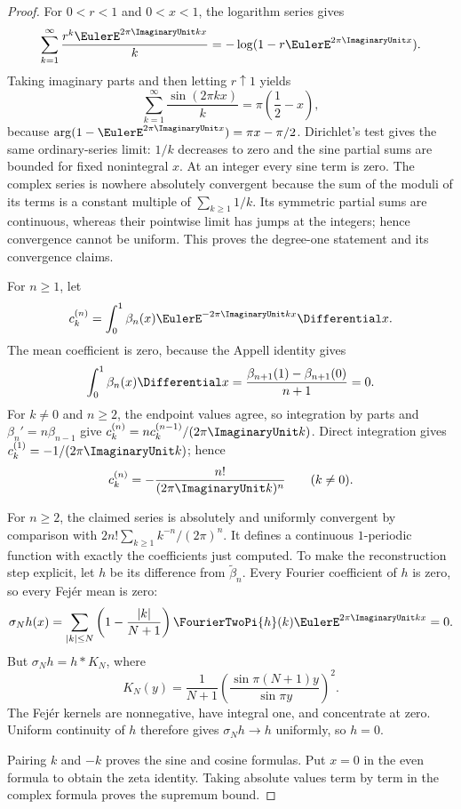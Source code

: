 \documentclass[11pt,a4paper,oneside,openany]{book}
\theoremstyle{definition}
\theoremstyle{remark}
\begin{document}
\begin{proof}
For $0<r<1$ and $0<x<1$, the logarithm series gives
\[
 \sum_{k=1}^{\infty}\frac{r^k\EulerE^{2\pi \ImaginaryUnit kx}}k
 =-\log(1-r\EulerE^{2\pi \ImaginaryUnit x}).
\]
Taking imaginary parts and then letting $r\uparrow1$ yields
\[
 \sum_{k=1}^{\infty}\frac{\sin(2\pi kx)}k
 =\pi\left(\frac12-x\right),
\]
because $\arg(1-\EulerE^{2\pi \ImaginaryUnit x})=\pi x-\pi/2$.  Dirichlet's test gives
the same ordinary-series limit: $1/k$ decreases to zero and the sine partial
sums are bounded for fixed nonintegral $x$.  At an integer every sine term is
zero.  The complex series is nowhere absolutely convergent because the sum of
the moduli of its terms is a constant multiple of $\sum_{k\geq1}1/k$.  Its
symmetric partial sums are continuous, whereas their pointwise limit has
jumps at the integers; hence convergence cannot be uniform.  This proves the
degree-one statement and its convergence claims.

For $n\geq1$, let
\[
 c_k^{(n)}=\int_0^1\beta_n(x)\EulerE^{-2\pi \ImaginaryUnit kx}\Differential x.
\]
The mean coefficient is zero, because the Appell identity gives
\[
 \int_0^1\beta_n(x)\Differential x
 =\frac{\beta_{n+1}(1)-\beta_{n+1}(0)}{n+1}=0.
\]
For $k\ne0$ and $n\geq2$, the endpoint values agree, so integration by parts
and $\beta_n'=n\beta_{n-1}$ give
$c_k^{(n)}=n c_k^{(n-1)}/(2\pi \ImaginaryUnit k)$.  Direct integration gives
$c_k^{(1)}=-1/(2\pi \ImaginaryUnit k)$; hence
\begin{equation}
 c_k^{(n)}=-\frac{n!}{(2\pi \ImaginaryUnit k)^n}\qquad(k\ne0).                  \label{eq:merged-periodic-bernoulli-coefficients}
\end{equation}

For $n\geq2$, the claimed series is absolutely and uniformly convergent by
comparison with $2n!\sum_{k\geq1}k^{-n}/(2\pi)^n$.  It defines a continuous
$1$-periodic function with exactly the coefficients just computed.  To make
the reconstruction step explicit, let $h$ be its difference from
$\widetilde\beta_n$.  Every Fourier coefficient of $h$ is zero, so every
Fejér mean is zero:
\[
 \sigma_Nh(x)=\sum_{|k|\leq N}
 \left(1-\frac{|k|}{N+1}\right)\FourierTwoPi{h}(k)\EulerE^{2\pi \ImaginaryUnit kx}=0.
\]
But $\sigma_Nh=h*K_N$, where
\[
 K_N(y)=\frac1{N+1}
 \left(\frac{\sin\pi(N+1)y}{\sin\pi y}\right)^2.
\]
The Fejér kernels are nonnegative, have integral one, and concentrate at
zero.  Uniform continuity of $h$ therefore gives $\sigma_Nh\to h$ uniformly,
so $h=0$.

Pairing $k$ and $-k$ proves the sine and cosine formulas.  Put $x=0$ in the
even formula to obtain the zeta identity.  Taking absolute values term by
term in the complex formula proves the supremum bound.
\end{proof}
\end{document}
